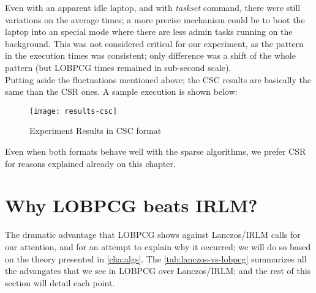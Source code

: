 Even with an apparent idle laptop,
  and with \emph{taskset} command, there were still variations on the
  average times; a more precise mechanism could be to boot the laptop
  into an special mode where there are less admin tasks running on the
background. This was not considered critical for our experiment, as
the pattern in the execution times was consistent; only difference was
a shift of the whole pattern (but \gls{LOBPCG} times remained in sub-second
scale). \\ 

Putting aside the fluctuations mentioned above; the CSC results are
basically the same than the CSR ones. A sample execution is shown
below: 

\begin{figure}[H]
  \centering
  \caption{Experiment Results in CSC format}   
  \texttt{[image: results-csc]}
\end{figure}

Even when both formats behave well with the sparse algorithms, we
prefer CSR for reasons explained already on this chapter.

\section{Why \gls{LOBPCG} beats \gls{IRLM}?}
\label{sec:why-lobpcg}

The dramatic advantage that \gls{LOBPCG} shows against
Lanczos/\gls{IRLM} calls for our attention, and for an attempt to
explain why it occurred; we will do so based on the theory presented
in \cref{cha:algs}. The \cref{tab:lanczos-vs-lobpcg} summarizes all
the advangates 
that we see in \gls{LOBPCG} over Lanczos/\gls{IRLM}; and the rest of
this section will detail each point.

